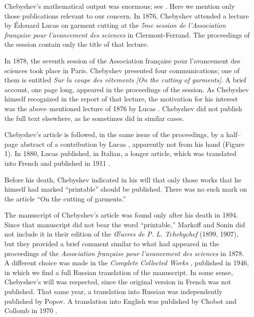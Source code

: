 \documentclass[12pt]{article}
\begin{document}
Chebyshev's mathematical output was enormous; see \cite{Chebyshev1946b}. Here we mention only those publications relevant to our concern. In 1876, Chebyshev attended a lecture by \'Edouard Lucas \cite{Lucas1876} on garment cutting at the {\it 5me session de l'Association fran\c caise pour l'avancement des sciences} in Clermont-Ferrand. The proceedings of the session contain only the title of that lecture.

In 1878, the seventh session of the Association fran\c caise pour l'avancement des sciences took place in Paris. Chebyshev presented four communications; one of them \cite{Chebyshev1878} is entitled {\it Sur la coupe des v\^etements} {\it [On the cutting of garments]}. A brief account, one page long, appeared in the proceedings of the session. As Chebyshev himself recognized in the report of that lecture, the motivation for his interest was the above--mentioned lecture of 1876 by Lucas \cite{Lucas1876}. Chebyshev did not publish the full text elsewhere, as he sometimes did in similar cases.

Chebyshev's article is followed, in the same issue of the proceedings, by a half--page abstract of a contribution by Lucas \cite{Lucas1878}, apparently not from his hand (Figure 1). In 1880, Lucas published, in Italian, a longer article, which was translated into French and published in 1911 \cite{Lucas1911}.

Before his death, Chebyshev indicated in his will that only those works that he himself had marked ``printable'' should be published. There was no such mark on the article ``On the cutting of garments.”

The manuscript of Chebyshev's article was found only after his death in 1894. Since that manuscript did not bear the word ``printable,'' Markoff and Sonin \cite{Markoff1899} did not include it in their edition of the {\it \OE uvres de P. L. Tchebychef} (1899, 1907), but they provided a brief comment similar to what had appeared in the proceedings of the {\it Association fran\c caise pour l'avancement des sciences} in 1878. A different choice was made in the {\it Complete Collected Works} \cite{Chebyshev1946b}, published in 1946, in which we find a full Russian translation of the manuscript. In some sense, Chebyshev's will was respected, since the original version in French was not published. That same year, a translation into Russian \cite{Chebyshev1946a} was independently published by Popov. A translation into English was published by Chobot and Collomb in 1970 \cite{Chobot1970}.
\end{document}
